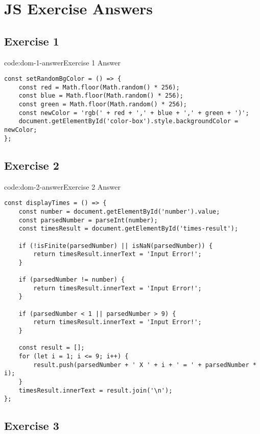 \section{JS Exercise Answers} \label{sect:js-exercise-answers}

\subsection*{Exercise 1}

\begin{codeenv}{code:dom-1-answer}{Exercise 1 Answer}\begin{verbatim}
const setRandomBgColor = () => {
    const red = Math.floor(Math.random() * 256);
    const blue = Math.floor(Math.random() * 256);
    const green = Math.floor(Math.random() * 256);
    const newColor = 'rgb(' + red + ',' + blue + ',' + green + ')';
    document.getElementById('color-box').style.backgroundColor = newColor;
};
\end{verbatim}
\end{codeenv}

\subsection*{Exercise 2}

\begin{codeenv}{code:dom-2-answer}{Exercise 2 Answer}\begin{verbatim}
const displayTimes = () => {
    const number = document.getElementById('number').value;
    const parsedNumber = parseInt(number);
    const timesResult = document.getElementById('times-result');

    if (!isFinite(parsedNumber) || isNaN(parsedNumber)) {
        return timesResult.innerText = 'Input Error!';
    }

    if (parsedNumber != number) {
        return timesResult.innerText = 'Input Error!';
    }

    if (parsedNumber < 1 || parsedNumber > 9) {
        return timesResult.innerText = 'Input Error!';
    }

    const result = [];
    for (let i = 1; i <= 9; i++) {
        result.push(parsedNumber + ' X ' + i + ' = ' + parsedNumber * i);
    }
    timesResult.innerText = result.join('\n');
};
\end{verbatim}
\end{codeenv}

\subsection*{Exercise 3}

